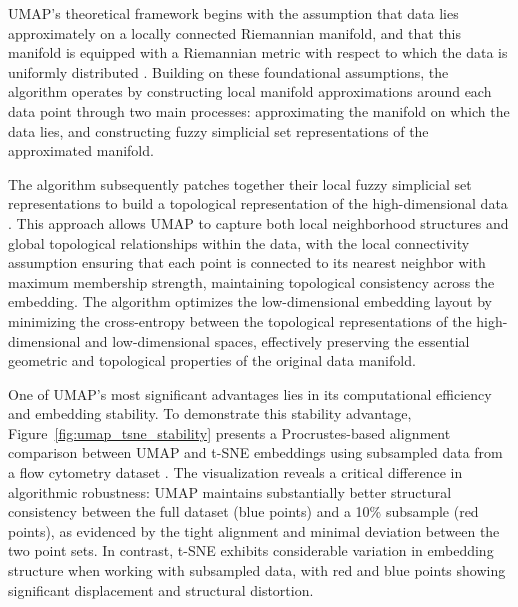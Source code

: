 UMAP's theoretical framework begins with the assumption that data lies approximately on a locally connected Riemannian manifold, and that this manifold is equipped with a Riemannian metric with respect to which the data is uniformly distributed \cite{mcinnes2020umap}. Building on these foundational assumptions, the algorithm operates by constructing local manifold approximations around each data point through two main processes: approximating the manifold on which the data lies, and constructing fuzzy simplicial set representations of the approximated manifold. 

The algorithm subsequently patches together their local fuzzy simplicial set representations to build a topological representation of the high-dimensional data \cite{mcinnes2020umap}. This approach allows UMAP to capture both local neighborhood structures and global topological relationships within the data, with the local connectivity assumption ensuring that each point is connected to its nearest neighbor with maximum membership strength, maintaining topological consistency across the embedding. The algorithm optimizes the low-dimensional embedding layout by minimizing the cross-entropy between the topological representations of the high-dimensional and low-dimensional spaces, effectively preserving the essential geometric and topological properties of the original data manifold.

One of UMAP's most significant advantages lies in its computational efficiency and embedding stability. To demonstrate this stability advantage, Figure~\ref{fig:umap_tsne_stability} presents a Procrustes-based alignment comparison between UMAP and t-SNE embeddings using subsampled data from a flow cytometry dataset \cite{mcinnes2020umapuniformmanifoldapproximation}. The visualization reveals a critical difference in algorithmic robustness: UMAP maintains substantially better structural consistency between the full dataset (blue points) and a 10\% subsample (red points), as evidenced by the tight alignment and minimal deviation between the two point sets. In contrast, t-SNE exhibits considerable variation in embedding structure when working with subsampled data, with red and blue points showing significant displacement and structural distortion.

